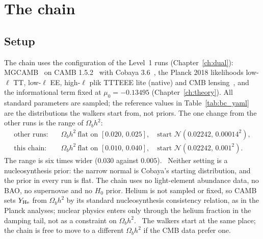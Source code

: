 \section{The chain}\label{sec:bc_chain}
\subsection{Setup}
The chain uses the configuration of the Level~1 runs (Chapter~\ref{ch:dual}): MGCAMB~\cite{Zhao2009MGCAMB,Wang2023MGCAMB} on CAMB
1.5.2~\cite{Lewis2000CAMB} with Cobaya 3.6~\cite{Torrado2021}, the Planck 2018 likelihoods low-$\ell$ TT, low-$\ell$ EE, high-$\ell$
plik TTTEEE lite (native) and CMB lensing~\cite{Planck2018V,Planck2018VIII}, and the informational term fixed at $\mu_0=-0.13495$
(Chapter~\ref{ch:theory}). All standard parameters are sampled; the reference values in Table~\ref{tab:bc_yaml} are the distributions the
walkers start from, not priors. The one change from the other runs is the range of $\Omega_bh^2$:
\begin{align}
\text{other runs:}\quad &\Omega_bh^2\ \text{flat on }[0.020,\,0.025],\quad \text{start }\mathcal N(0.02242,\,0.00014^2),\label{eq:bc_std}\\
\text{this chain:}\quad &\Omega_bh^2\ \text{flat on }[0.010,\,0.040],\quad \text{start }\mathcal N(0.02242,\,0.001^2).\label{eq:bc_test}
\end{align}
The range is six times wider ($0.030$ against $0.005$). \calc\ Neither setting is a nucleosynthesis prior: the narrow normal is Cobaya's
starting distribution, and the prior in every run is flat. The chain uses no light-element abundance data, no BAO, no supernovae and no
$H_0$ prior. Helium is not sampled or fixed, so CAMB sets $Y_{\rm He}$ from $\Omega_bh^2$ by its standard nucleosynthesis consistency
relation, as in the Planck analyses; nuclear physics enters only through the helium fraction in the damping tail, not as a constraint on
$\Omega_bh^2$. \observed\ The walkers start at the same place; the chain is free to move to a different $\Omega_bh^2$ if the CMB data prefer
one.


